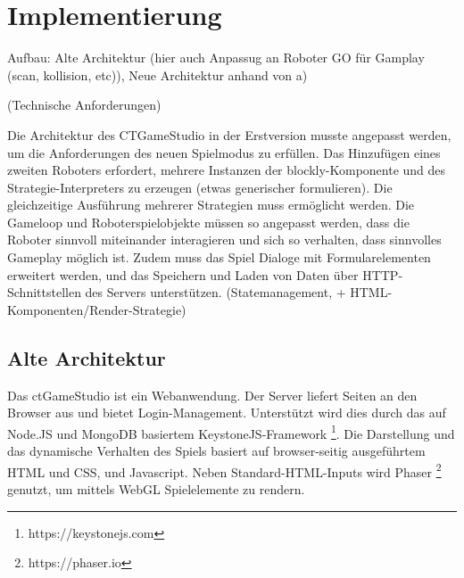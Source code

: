 \chapter{Implementierung}

Aufbau: Alte Architektur (hier auch Anpassug an Roboter GO für Gamplay (scan, kollision, etc)), Neue
Architektur anhand von a)

(Technische Anforderungen)

Die Architektur des CTGameStudio in der Erstversion musste angepasst werden, um die Anforderungen
des neuen Spielmodus zu erfüllen. Das Hinzufügen eines zweiten Roboters erfordert, mehrere Instanzen
der blockly-Komponente und des Strategie-Interpreters zu erzeugen (etwas generischer formulieren).
Die gleichzeitige Ausführung mehrerer Strategien muss ermöglicht werden. Die Gameloop und
Roboterspielobjekte müssen so angepasst werden, dass die Roboter sinnvoll miteinander interagieren
und sich so verhalten, dass sinnvolles Gameplay möglich ist. Zudem muss das Spiel Dialoge mit
Formularelementen erweitert werden, und das Speichern und Laden von Daten über HTTP-Schnittstellen
des Servers unterstützen. (Statemanagement, + HTML-Komponenten/Render-Strategie)


\section{Alte Architektur}

Das ctGameStudio ist ein Webanwendung. Der Server liefert Seiten an den Browser aus und bietet
Login-Management. Unterstützt wird dies durch das auf Node.JS und MongoDB basiertem
KeystoneJS-Framework \footnote{https://keystonejs.com}. Die Darstellung und das dynamische Verhalten
des Spiels basiert auf browser-seitig ausgeführtem HTML und CSS, und Javascript. Neben
Standard-HTML-Inputs wird Phaser \footnote{https://phaser.io} genutzt, um mittels WebGL
Spielelemente zu rendern.

